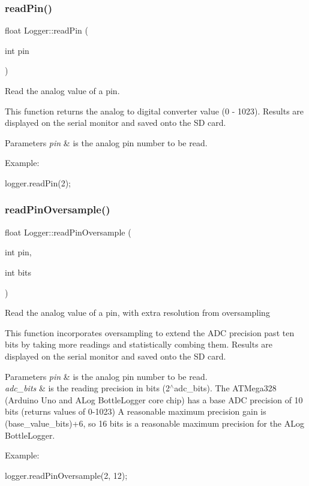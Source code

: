 \subsubsection{\texorpdfstring{read\+Pin()}{readPin()}}
{\footnotesize\ttfamily float Logger\+::read\+Pin (\begin{DoxyParamCaption}\item[{int}]{pin }\end{DoxyParamCaption})}

Read the analog value of a pin.

This function returns the analog to digital converter value (0 -\/ 1023). Results are displayed on the serial monitor and saved onto the SD card.


\begin{DoxyParams}{Parameters}
{\em pin} & is the analog pin number to be read.\\
\hline
\end{DoxyParams}
Example\+: 
\begin{DoxyCode}
logger.readPin(2);
\end{DoxyCode}
\mbox{\label{classLogger_a4e67526c65fa865f276a515a200af4aa}} 
\subsubsection{\texorpdfstring{read\+Pin\+Oversample()}{readPinOversample()}}
{\footnotesize\ttfamily float Logger\+::read\+Pin\+Oversample (\begin{DoxyParamCaption}\item[{int}]{pin,  }\item[{int}]{bits }\end{DoxyParamCaption})}

Read the analog value of a pin, with extra resolution from oversampling

This function incorporates oversampling to extend the A\+DC precision past ten bits by taking more readings and statistically combing them. Results are displayed on the serial monitor and saved onto the SD card.


\begin{DoxyParams}{Parameters}
{\em pin} & is the analog pin number to be read.\\
\hline
{\em adc\+\_\+bits} & is the reading precision in bits (2$^\wedge$adc\+\_\+bits). The A\+T\+Mega328 (Arduino Uno and A\+Log Bottle\+Logger core chip) has a base A\+DC precision of 10 bits (returns values of 0-\/1023) A reasonable maximum precision gain is (base\+\_\+value\+\_\+bits)+6, so 16 bits is a reasonable maximum precision for the A\+Log Bottle\+Logger.\\
\hline
\end{DoxyParams}
Example\+: 
\begin{DoxyCode}
logger.readPinOversample(2, 12);
\end{DoxyCode}


